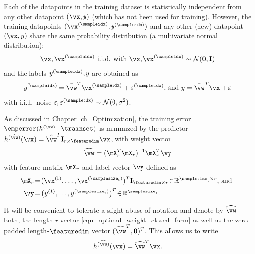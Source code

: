 \documentclass[12pt]{report}
\begin{document}
Each of the datapoints in the training dataset is statistically independent from 
any other datapoint $(\vx,y)$ (which has not been used for training). However, 
the training datapoints $(\vx^{(\sampleidx)},y^{(\sampleidx)})$ and any other (new) 
datapoint $(\vx,y)$ share the same probability distribution (a multivariate normal distribution): 
\begin{equation} 
\label{equ_toy_model_iid}
\vx, \vx^{(\sampleidx)} \mbox{ i.i.d. with } \vx, \vx^{(\sampleidx)} \sim \mathcal{N}(\mathbf{0}, \mathbf{I}) 
\end{equation} 
and the labels $y^{(\sampleidx)},y$ are obtained as 
\begin{equation} 
\label{equ_labels_training_data}
y^{(\sampleidx)} = \bar{\vw}^{T}  \vx^{(\sampleidx)} + \varepsilon^{(\sampleidx)}\mbox{, and } y = \bar{\vw}^{T}  \vx + \varepsilon
\end{equation}  
with i.i.d.\ noise $\varepsilon, \varepsilon^{(\sampleidx)} \sim \mathcal{N}(0,\sigma^{2})$. 

As discussed in Chapter \ref{ch_Optimization}, the training error $\emperror (h^{(\vw)} \mid \trainset)$ 
is minimized by the predictor $h^{(\hat{\vw})}(\vx) =  \hat{\vw}^{T} \mathbf{I}_{r \times \featuredim} \vx$, 
with weight vector 
\begin{equation}
\label{equ_optimal_weight_closed_form}
\widehat{\vw} =  (\mX^{T}_{r} \mX_{r})^{-1} \mX_{r}^{T} \vy
\end{equation} 
with feature matrix $\mX_{r}$ and label vector $\vy$ defined as 
\begin{align}
\label{equ_def_feature_matrix_r}
\mX_{r}& \!=\!(\vx^{(1)},\ldots,\vx^{(\samplesize_{\rm t})})^{T} \mathbf{I}_{\featuredim \times r}\!\in\!\mathbb{R}^{\samplesize_{\rm t} \times r} \mbox{, and }  \nonumber \\
\vy& \!=\!\big(y^{(1)},\ldots,y^{(\samplesize_{\rm t})}\big)^{T}\!\in\!\mathbb{R}^{\samplesize_{\rm t}}.
\end{align} 

It will be convenient to tolerate a slight abuse of notation and denote by $\widehat{\vw}$ 
both, the length-$r$ vector \eqref{equ_optimal_weight_closed_form} as well as the zero 
padded length-$\featuredim$ vector $(\widehat{\vw}^{T},\mathbf{0})^{T}$. 
This allows us to write %
\begin{equation} 
h^{(\widehat{\vw})}(\vx) = \widehat{\vw}^{T} \vx. 
\end{equation}
\end{document}
